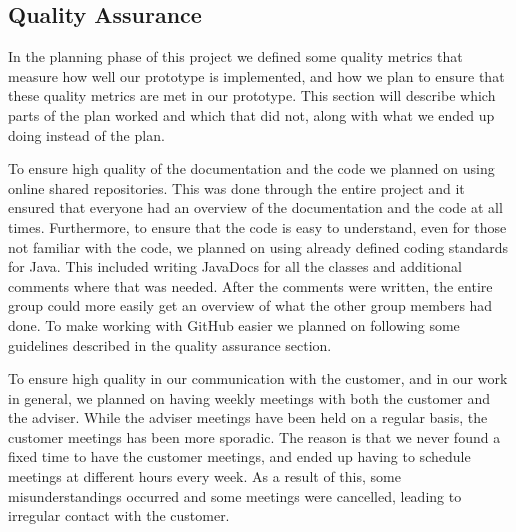 \documentclass[../document]{subfiles}
\begin{document}
\subsection{Quality Assurance}
In the planning phase of this project we defined some quality metrics that measure how well our prototype is implemented, and how we plan to ensure that these quality metrics are met in our prototype. This section will describe which parts of the plan worked and which that did not, along with what we ended up doing instead of the plan.

To ensure high quality of the documentation and the code we planned on using online shared repositories. This was done through the entire project and it ensured that everyone had an overview of the documentation and the code at all times. Furthermore, to ensure that the code is easy to understand, even for those not familiar with the code, we planned on using already defined coding standards for \gls{Java}. This included writing JavaDocs for all the classes and additional comments where that was needed. After the comments were written, the entire group could more easily get an overview of what the other group members had done. To make working with GitHub easier we planned on following some guidelines described in the quality assurance section.

To ensure high quality in our communication with the customer, and in our work in general, we planned on having weekly meetings with both the customer and the adviser. While the adviser meetings have been held on a regular basis, the customer meetings has been more sporadic. The reason is that we never found a fixed time to have the customer meetings, and ended up having to schedule meetings at different hours every week. As a result of this, some misunderstandings occurred and some meetings were cancelled, leading to irregular contact with the customer.
\end{document}
